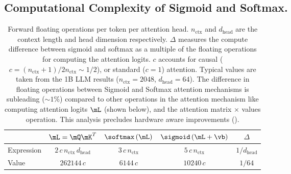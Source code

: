\subsection{Computational Complexity of Sigmoid and Softmax.}
\label{sec:parameter_and_flops}
\vspace{-0.1in}
\begin{table}[h!]
\small
\centering
\caption{Forward floating operations per token per attention head. 
$n_\text{ctx}$ and $d_\text{head}$ are the context length and head dimension respectively. 
$\Delta$ measures the compute difference between sigmoid and softmax as a multiple of the floating operations for computing the attention logits. 
$c$ accounts for causal ($c=(n_\text{ctx}+1)/2n_\text{ctx}\sim1/2$), or standard ($c=1$) attention.
Typical values are taken from the 1B LLM results ($n_\text{ctx}=2048$, $d_\text{head}=64$).
The difference in floating operations between Sigmoid and Softmax attention mechanisms is subleading ($\sim1\%$) compared to other operations in the attention mechanism like computing attention logits $\mL$ (shown below), and the attention matrix $\times$ values operation. This analysis precludes hardware aware improvements ().
}
\label{tab:flop-counts}
\begin{tabular}{lcccc}
\toprule
& $\mL=\mQ\mK^T$ & $\softmax\left(\mL\right)$ & $\sigmoid\left(\mL+\vb\right)$ & $\Delta$ \\ \midrule 
Expression & $ 2\,c\,n_\text{ctx}\,d_{\text{head}}$ & $ 3\,c\,n_\text{ctx}$ & $ 5\,c\,n_\text{ctx}$ & $1/d_{\text{head}}$\\
Value & $262144\,c$ & $6144\,c$ & $10240\,c$ & $1/64$ \\ \bottomrule
\end{tabular}
\end{table}
